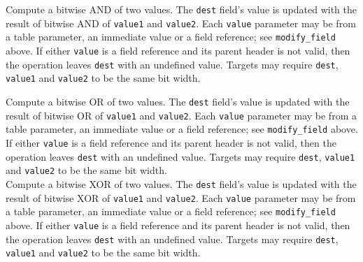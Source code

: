 \documentclass[12pt]{article}
\begin{document}

{ %
Compute a bitwise AND of two values.
}
{ %
}
{ %
The \texttt{dest} field's value is updated with the result of bitwise AND of
\texttt{value1} and \texttt{value2}. Each \texttt{value} parameter may be from a
table parameter, an immediate value or a field reference; see \texttt{modify_field} above. If either \texttt{value}
is a field reference and its parent header is not valid, then the operation
leaves \texttt{dest} with an undefined value.
Targets may require \texttt{dest}, \texttt{value1} and \texttt{value2} to
be the same bit width.
}


{ %
Compute a bitwise OR of two values.
}
{ %
}
{ %
The \texttt{dest} field's value is updated with the result of bitwise OR of
\texttt{value1} and \texttt{value2}. Each \texttt{value} parameter may be from a
table parameter, an immediate value or a field reference; see \texttt{modify_field} above. If either \texttt{value}
is a field reference and its parent header is not valid, then the operation
leaves \texttt{dest} with an undefined value.
Targets may require \texttt{dest}, \texttt{value1} and \texttt{value2} to
be the same bit width.
}\\


{ %
Compute a bitwise XOR of two values.
}
{ %
}
{ %
The \texttt{dest} field's value is updated with the result of bitwise XOR of
\texttt{value1} and \texttt{value2}. Each \texttt{value} parameter may be from a
table parameter, an immediate value or a field reference; see \texttt{modify_field} above. If either \texttt{value}
is a field reference and its parent header is not valid, then the operation
leaves \texttt{dest} with an undefined value.
Targets may require \texttt{dest}, \texttt{value1} and \texttt{value2} to
be the same bit width.
}\\
\end{document}
